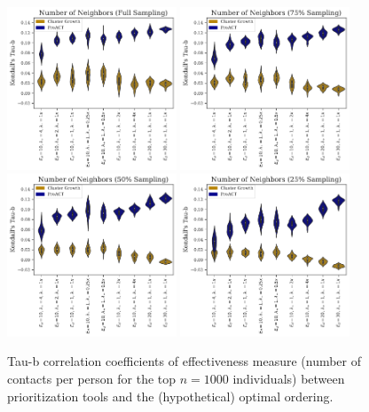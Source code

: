 \documentclass[a4paper,11pt]{article}
\begin{document}
\clearpage

\begin{figure}[!h]
\centering
\includegraphics[width=0.45\textwidth]{figs/results_efficacy_tau_contacts.pdf}
\includegraphics[width=0.45\textwidth]{figs/results_efficacy_tau_contacts_sub75.pdf}\\
\includegraphics[width=0.45\textwidth]{figs/results_efficacy_tau_contacts_sub50.pdf}
\includegraphics[width=0.45\textwidth]{figs/results_efficacy_tau_contacts_sub25.pdf}\\
\caption{Tau-b correlation coefficients of effectiveness measure (number of contacts per person for the top $n=1000$ individuals) between prioritization tools and the (hypothetical) optimal ordering.}\label{fig:tau-b-values-contacts}
\end{figure}
\end{document}
